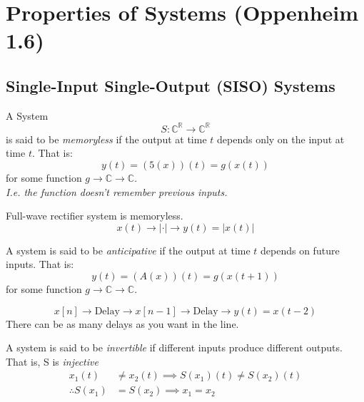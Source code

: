 \chapter{Properties of Systems (Oppenheim 1.6)}

\section{Single-Input Single-Output (SISO) Systems}

\begin{definition}
    []
    A System $$S : \mathbb{C}^{\mathbb{R}} \to \mathbb{C}^{\mathbb{R}}$$
    is said to be \textit{memoryless} if the output at time $t$ depends only on the input at time $t$. That is:
    $$ y(t) = (5(x))(t) = g(x(t))$$
    for some function $g \to \mathbb{C} \to \mathbb{C}$.\\
    \textit{I.e. the function doesn't remember previous inputs.}
\end{definition}

\begin{example}
    Full-wave rectifier system is memoryless.\\
    $$x(t) \to \boxed{| \cdot |} \to y(t) = |x(t)|$$
\end{example}


\begin{definition}
    [Anticipation]
    A system is said to be \textit{anticipative} if the output at time $t$ depends on future inputs. That is:
    $$ y(t) = (A(x))(t) = g(x(t+1))$$
    for some function $g \to \mathbb{C} \to \mathbb{C}$.\\
\end{definition}

\begin{definition}
    $$x[n] \to \boxed{\text{Delay}} \to x[n-1] \to \boxed{\text{Delay}}\to y(t) = x(t-2)$$
    There can be as many delays as you want in the line.
\end{definition}

\begin{definition}
    A system is said to be \textit{invertible} if different inputs produce different outputs. That is, S is \textit{injective}
    \begin{align*}
        x_1(t)            & \neq x_2(t) \implies S(x_1)(t) \neq S(x_2)(t) \\
        \therefore S(x_1) & = S(x_2) \implies x_1 = x_2
    \end{align*}
\end{definition}

